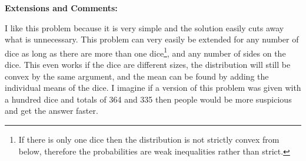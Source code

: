 \textbf{Extensions and Comments:}

I like this problem because it is very simple and the solution easily cuts away what is unnecessary. This problem can very easily be extended for any number of dice as long as there are more than one dice\footnote{If there is only one dice then the distribution is not strictly convex from below, therefore the probabilities are weak inequalities rather than strict.}, and any number of sides on the dice. This even works if the dice are different sizes, the distribution will still be convex by the same argument, and the mean can be found by adding the individual means of the dice. I imagine if a version of this problem was given with a hundred dice and totals of 364 and 335 then people would be more suspicious and get the answer faster.